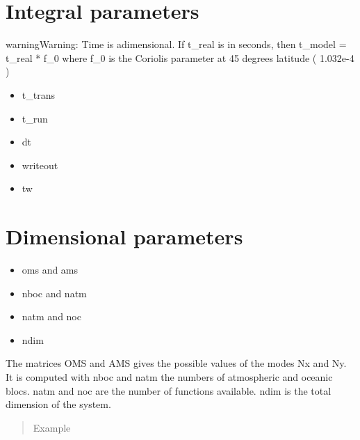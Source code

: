 \documentclass[letterpaper,10pt,english]{sphinxmanual}
\begin{document}
\section{Integral parameters}
\label{rstfiles/params2:integral-parameters}
\begin{notice}{warning}{Warning:}
Time is adimensional. If t\_real is in seconds, then t\_model = t\_real * f\_0
where f\_0 is the Coriolis parameter at 45 degrees latitude ( 1.032e-4 )
\end{notice}
\begin{itemize}
\item {} 
t\_trans

\item {} 
t\_run

\item {} 
dt

\item {} 
writeout

\item {} 
tw

\end{itemize}


\section{Dimensional parameters}
\label{rstfiles/params2:dimensional-parameters}\begin{itemize}
\item {} 
oms and ams

\item {} 
nboc and natm

\item {} 
natm and noc

\item {} 
ndim

\end{itemize}

The matrices OMS and AMS gives the possible values of the modes Nx and Ny.
It is computed with nboc and natm the numbers of atmospheric and oceanic blocs.
natm and noc are the number of functions available.
ndim is the total dimension of the system.
\begin{quote}\begin{description}
\item[{Example}] \leavevmode
\end{description}\end{quote}
\end{document}
